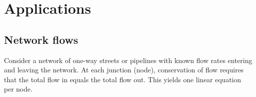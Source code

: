 \section{Applications}\label{sec:applications-systems}

\subsection{Network flows}\label{subsec:network-flows}

Consider a network of one-way streets or pipelines with known flow
rates entering and leaving the network. At each junction
(node), conservation of flow requires that the total
flow in equals the total flow out. This yields one linear equation per
node.

